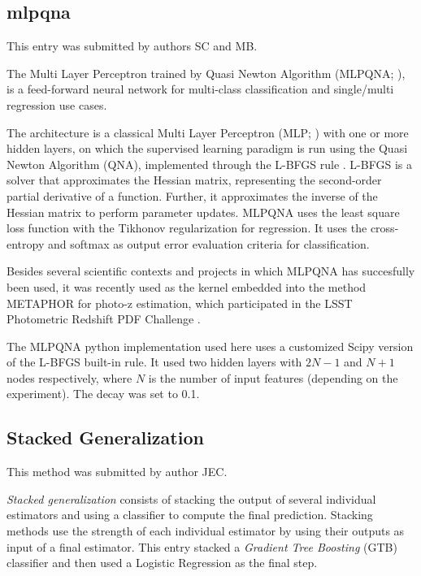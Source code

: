 \documentclass[twocolumn,twocolappendix]{aastex63}
\begin{document}
\subsection{ {\sc mlpqna} }
This entry was submitted by authors SC and MB.

The Multi Layer Perceptron trained by Quasi Newton Algorithm 
({\sc MLPQNA}; \citealp{Brescia12}), is a feed-forward neural network 
for multi-class classification and single/multi regression use cases.

The architecture is a classical Multi Layer Perceptron (MLP; \citealp{Rosenblatt1961})
with one or more hidden layers, on which the supervised learning paradigm is run
using the Quasi Newton Algorithm (QNA), implemented through the L-BFGS rule
\citep{Nocedal80}. L-BFGS is a solver that approximates the Hessian matrix,
representing the second-order partial derivative of a function. Further, it
approximates the inverse of the Hessian matrix to perform parameter updates.
MLPQNA uses the least square loss function with the Tikhonov regularization
\citep{Tikhonov77} for regression. It uses the cross-entropy \citep{deBoer05}
and softmax \citep{Sutton98} as output error evaluation criteria for
classification.

Besides several scientific contexts and projects in which MLPQNA has succesfully
been used, it was recently used as the kernel embedded into the method {\sc
METAPHOR} \citep{cavuoti20} for photo-z estimation, which participated in the
LSST Photometric Redshift PDF Challenge \citep{schmidt20}. 

The {\sc MLPQNA} python implementation used here
uses a customized Scipy version of the L-BFGS built-in rule.
It used two hidden layers with $2N-1$ and $N+1$ nodes respectively,
where $N$ is the number of input features (depending on the experiment).
The decay was set to 0.1.


\subsection{ {\sc Stacked Generalization} }
This method was submitted by author JEC.

\emph{Stacked generalization} consists of stacking the output of several individual estimators and 
using a classifier to compute the final prediction. Stacking methods use the strength of each 
individual estimator by using their outputs as input of a final estimator.  This entry stacked
a \emph{Gradient Tree Boosting} (GTB) classifier and then used a Logistic Regression as the final step.
\end{document}
